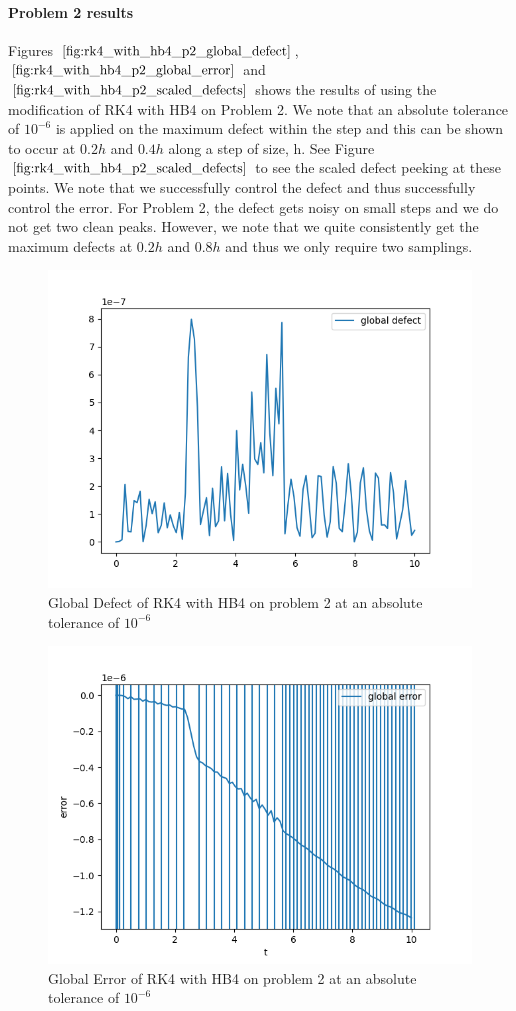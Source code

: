 \documentclass{article}
\begin{document}
\paragraph{Problem 2 results}
Figures $\ref{fig:rk4_with_hb4_p2_global_defect}$, $\ref{fig:rk4_with_hb4_p2_global_error}$ and $\ref{fig:rk4_with_hb4_p2_scaled_defects}$ shows the results of using the modification of RK4 with HB4 on Problem 2. We note that an absolute tolerance of $10^{-6}$ is applied on the maximum defect within the step and this can be shown to occur at $0.2h$ and $0.4h$ along a step of size, h. See Figure $\ref{fig:rk4_with_hb4_p2_scaled_defects}$ to see the scaled defect peeking at these points. We note that we successfully control the defect and thus successfully control the error. For Problem 2, the defect gets noisy on small steps and we do not get two clean peaks. However, we note that we quite consistently get the maximum defects at $0.2h$ and $0.8h$ and thus we only require two samplings.

\begin{figure}[H]
\centering
\includegraphics[width=0.7\linewidth]{./figures/rk4_with_hb4_p2_global_defect}
\caption{Global Defect of RK4 with HB4 on problem 2 at an absolute tolerance of $10^{-6}$}
\label{fig:rk4_with_hb4_p2_global_defect}
\end{figure}

\begin{figure}[H]
\centering
\includegraphics[width=0.7\linewidth]{./figures/rk4_with_hb4_p2_global_error}
\caption{Global Error of RK4 with HB4 on problem 2 at an absolute tolerance of $10^{-6}$}
\label{fig:rk4_with_hb4_p2_global_error}
\end{figure}
\end{document}
